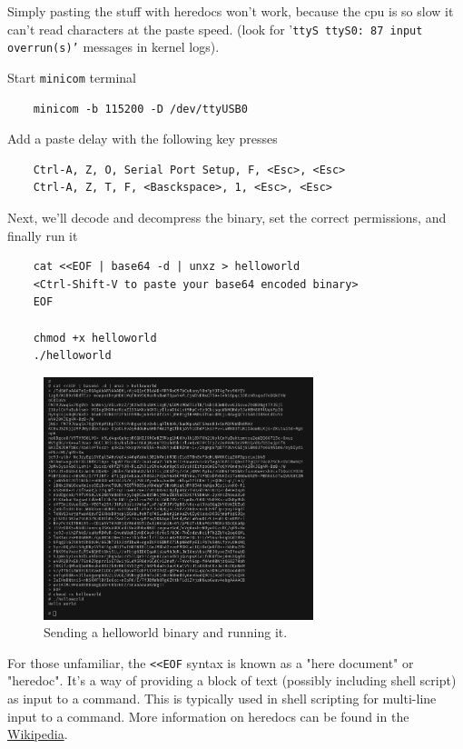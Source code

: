 \documentclass[a4paper]{article}
\let\oldtexttt\texttt
\renewcommand{\texttt}[1]{\textcolor{mygray}{\oldtexttt{#1}}}
\begin{document}
Simply pasting the stuff with heredocs won't work, because the cpu is so slow
it can't read characters at the paste speed. (look for '\texttt{ttyS ttyS0: 87 input
overrun(s)'} messages in kernel logs).

Start \texttt{minicom} terminal

\begin{lstlisting}
    minicom -b 115200 -D /dev/ttyUSB0
\end{lstlisting}

Add a paste delay with the following key presses

\begin{lstlisting}
    Ctrl-A, Z, O, Serial Port Setup, F, <Esc>, <Esc>
    Ctrl-A, Z, T, F, <Basckspace>, 1, <Esc>, <Esc>
\end{lstlisting}

Next, we'll decode and decompress the binary, set the correct permissions, and finally run it

\begin{lstlisting}
    cat <<EOF | base64 -d | unxz > helloworld
    <Ctrl-Shift-V to paste your base64 encoded binary>
    EOF

    chmod +x helloworld
    ./helloworld
\end{lstlisting}

\begin{figure}[H]
    \centering
    \includegraphics[width=0.7\textwidth]{helloworld.png}
    \captionsetup{width=0.8\textwidth}
    \caption{Sending a helloworld binary and running it.}
\end{figure}


For those unfamiliar, the \texttt{<<EOF} syntax is known as a "here document"
or "heredoc". It's a way of providing a block of text (possibly including shell
script) as input to a command. This is typically used in shell scripting for
multi-line input to a command. More information on heredocs can be found in the
\href{https://en.wikipedia.org/wiki/Here_document}{Wikipedia}.
\end{document}
